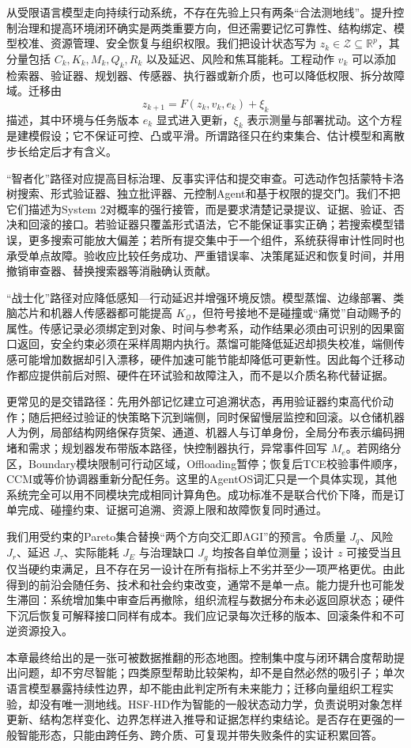 从受限语言模型走向持续行动系统，不存在先验上只有两条“合法测地线”。提升控制治理和提高环境闭环确实是两类重要方向，但还需要记忆可靠性、结构绑定、模型校准、资源管理、安全恢复与组织权限。我们把设计状态写为 $z_k\in\mathcal Z\subseteq\mathbb R^p$，其分量包括 $C_k,K_k,M_k,Q_k,R_k$ 以及延迟、风险和焦耳能耗。工程动作 $v_k$ 可以添加检索器、验证器、规划器、传感器、执行器或新介质，也可以降低权限、拆分故障域。迁移由
\[
z_{k+1}=F(z_k,v_k,e_k)+\xi_k
\]
描述，其中环境与任务版本 $e_k$ 显式进入更新，$\xi_k$ 表示测量与部署扰动。这个方程是建模假设；它不保证可控、凸或平滑。所谓路径只在约束集合、估计模型和离散步长给定后才有含义。

“智者化”路径对应提高目标治理、反事实评估和提交审查。可选动作包括蒙特卡洛树搜索、形式验证器、独立批评器、元控制Agent和基于权限的提交门。我们不把它们描述为System 2对概率的强行接管，而是要求清楚记录提议、证据、验证、否决和回滚的接口。若验证器只覆盖形式语法，它不能保证事实正确；若搜索模型错误，更多搜索可能放大偏差；若所有提交集中于一个组件，系统获得审计性同时也承受单点故障。验收应比较任务成功、严重错误率、决策尾延迟和恢复时间，并用撤销审查器、替换搜索器等消融确认贡献。

“战士化”路径对应降低感知—行动延迟并增强环境反馈。模型蒸馏、边缘部署、类脑芯片和机器人传感器都可能提高 $K_{\mathcal Q}$，但符号接地不是碰撞或“痛觉”自动赐予的属性。传感记录必须绑定到对象、时间与参考系，动作结果必须由可识别的因果窗口返回，安全约束必须在采样周期内执行。蒸馏可能降低延迟却损失校准，端侧传感可能增加数据却引入漂移，硬件加速可能节能却降低可更新性。因此每个迁移动作都应提供前后对照、硬件在环试验和故障注入，而不是以介质名称代替证据。

更常见的是交错路径：先用外部记忆建立可追溯状态，再用验证器约束高代价动作；随后把经过验证的快策略下沉到端侧，同时保留慢层监控和回滚。以仓储机器人为例，局部结构网络保存货架、通道、机器人与订单身份，全局分布表示编码拥堵和需求；规划器发布带版本路径，快控制器执行，异常事件回写 $M_e$。若网络分区，Boundary模块限制可行动区域，Offloading暂停；恢复后TCE校验事件顺序，CCM或等价协调器重新分配任务。这里的AgentOS词汇只是一个具体实现，其他系统完全可以用不同模块完成相同计算角色。成功标准不是联合代价下降，而是订单完成、碰撞约束、证据可追溯、资源上限和故障恢复同时通过。

我们用受约束的Pareto集合替换“两个方向交汇即AGI”的预言。令质量 $J_q$、风险 $J_r$、延迟 $J_\tau$、实际能耗 $J_E$ 与治理缺口 $J_g$ 均按各自单位测量；设计 $z$ 可接受当且仅当硬约束满足，且不存在另一设计在所有指标上不劣并至少一项严格更优。由此得到的前沿会随任务、技术和社会约束改变，通常不是单一点。能力提升也可能发生滞回：系统增加集中审查后再撤除，组织流程与数据分布未必返回原状态；硬件下沉后恢复可解释接口同样有成本。我们应记录每次迁移的版本、回滚条件和不可逆资源投入。

本章最终给出的是一张可被数据推翻的形态地图。控制集中度与闭环耦合度帮助提出问题，却不穷尽智能；四类原型帮助比较架构，却不是自然必然的吸引子；单次语言模型暴露持续性边界，却不能由此判定所有未来能力；迁移向量组织工程实验，却没有唯一测地线。HSF-HD作为智能的一般状态动力学，负责说明对象怎样更新、结构怎样变化、边界怎样进入推导和证据怎样约束结论。是否存在更强的一般智能形态，只能由跨任务、跨介质、可复现并带失败条件的实证积累回答。
